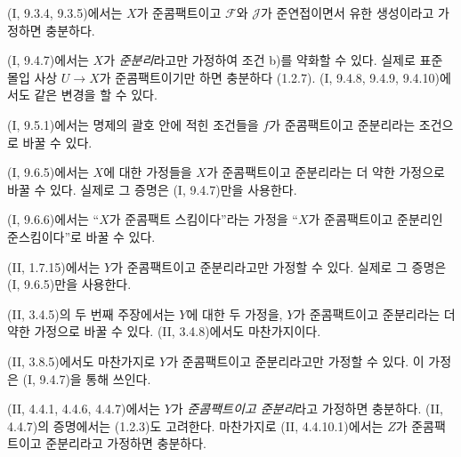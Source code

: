 \begin{env}[1.7.6]
\label{IV.1.7.6-fr}
(I, 9.3.4, 9.3.5)에서는 $X$가 준콤팩트이고 $\mathcal F$와
$\mathcal J$가 준연접이면서 유한 생성이라고 가정하면 충분하다.
\end{env}

\begin{env}[1.7.7]
\label{IV.1.7.7-fr}
(I, 9.4.7)에서는 $X$가 \emph{준분리}라고만 가정하여 조건 b)를
약화할 수 있다. 실제로 표준 몰입 사상 $U\to X$가 준콤팩트이기만
하면 충분하다 (1.2.7). (I, 9.4.8, 9.4.9, 9.4.10)에서도 같은 변경을
할 수 있다.
\end{env}

\begin{env}[1.7.8]
\label{IV.1.7.8-fr}
(I, 9.5.1)에서는 명제의 괄호 안에 적힌 조건들을 $f$가 준콤팩트이고
준분리라는 조건으로 바꿀 수 있다.
\end{env}

\begin{env}[1.7.9]
\label{IV.1.7.9-fr}
(I, 9.6.5)에서는 $X$에 대한 가정들을 $X$가 준콤팩트이고 준분리라는
더 약한 가정으로 바꿀 수 있다. 실제로 그 증명은 (I, 9.4.7)만을
사용한다.


(I, 9.6.6)에서는 ``$X$가 준콤팩트 스킴이다''라는 가정을 ``$X$가
준콤팩트이고 준분리인 준스킴이다''로 바꿀 수 있다.
\end{env}

\begin{env}[1.7.10]
\label{IV.1.7.10-fr}
(II, 1.7.15)에서는 $Y$가 준콤팩트이고 준분리라고만 가정할 수 있다.
실제로 그 증명은 (I, 9.6.5)만을 사용한다.
\end{env}

\begin{env}[1.7.11]
\label{IV.1.7.11-fr}
(II, 3.4.5)의 두 번째 주장에서는 $Y$에 대한 두 가정을, $Y$가
준콤팩트이고 준분리라는 더 약한 가정으로 바꿀 수 있다. (II,
3.4.8)에서도 마찬가지이다.
\end{env}

\begin{env}[1.7.12]
\label{IV.1.7.12-fr}
(II, 3.8.5)에서도 마찬가지로 $Y$가 준콤팩트이고 준분리라고만
가정할 수 있다. 이 가정은 (I, 9.4.7)을 통해 쓰인다.
\end{env}

\begin{env}[1.7.13]
\label{IV.1.7.13-fr}
(II, 4.4.1, 4.4.6, 4.4.7)에서는 $Y$가 \emph{준콤팩트이고
준분리}라고 가정하면 충분하다. (II, 4.4.7)의 증명에서는 (1.2.3)도
고려한다. 마찬가지로 (II, 4.4.10.1)에서는 $Z$가 준콤팩트이고
준분리라고 가정하면 충분하다.
\end{env}

